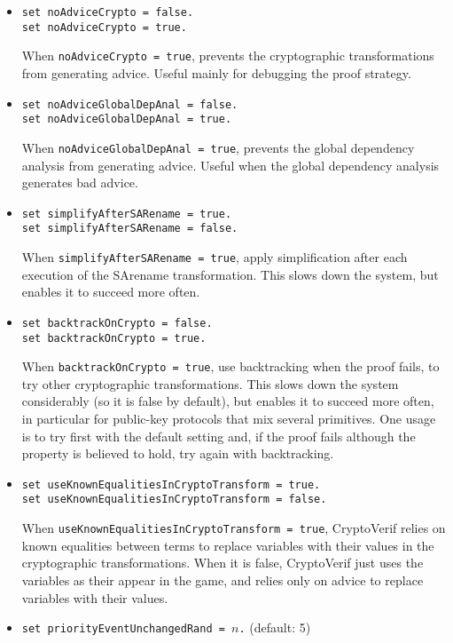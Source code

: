\begin{itemize}
\begin{itemize}
\item \texttt{set noAdviceCrypto = false.}\\
\texttt{set noAdviceCrypto = true.}

When \texttt{noAdviceCrypto = true}, prevents the cryptographic 
transformations from generating advice. Useful mainly for debugging
the proof strategy.

\item \texttt{set noAdviceGlobalDepAnal = false.}\\
\texttt{set noAdviceGlobalDepAnal = true.}

When \texttt{noAdviceGlobalDepAnal = true}, prevents the global
dependency analysis from generating advice. Useful when the global
dependency analysis generates bad advice.

\item \texttt{set simplifyAfterSARename = true.}\\
\texttt{set simplifyAfterSARename = false.}

When \texttt{simplifyAfterSARename = true}, apply simplification after
each execution of the SArename transformation. This slows down
the system, but enables it to succeed more often.

\item \texttt{set backtrackOnCrypto = false.}\\
\texttt{set backtrackOnCrypto = true.}

When \texttt{backtrackOnCrypto = true}, use backtracking when the proof
fails, to try other cryptographic transformations. This slows down
the system considerably (so it is false by default), but enables
it to succeed more often, in particular for public-key protocols
that mix several primitives. One usage is to try first with the default
setting and, if the proof fails although the property
is believed to hold, try again with backtracking.

\item \texttt{set useKnownEqualitiesInCryptoTransform = true.}\\
\texttt{set useKnownEqualitiesInCryptoTransform = false.}

When \texttt{useKnownEqualitiesInCryptoTransform = true}, CryptoVerif
relies on known equalities between terms to replace variables with
their values in the cryptographic transformations.
When it is false, CryptoVerif just uses the variables as their
appear in the game, and relies only on advice to replace variables
with their values. 

\item \texttt{set priorityEventUnchangedRand = $n$.} (default: 5)


\end{itemize}
\end{itemize}
